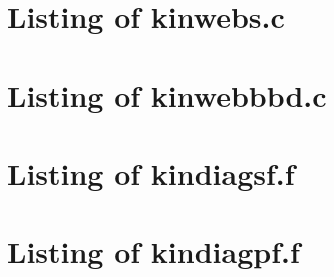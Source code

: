 
\newpage
\section{Listing of kinwebs.c}\label{s:kinwebs_c}

\newpage
\section{Listing of kinwebbbd.c}\label{s:kinwebbbd_c}


\newpage
\section{Listing of kindiagsf.f}\label{s:kindiagsf_f}

\newpage
\section{Listing of kindiagpf.f}\label{s:kindiagpf_f}


